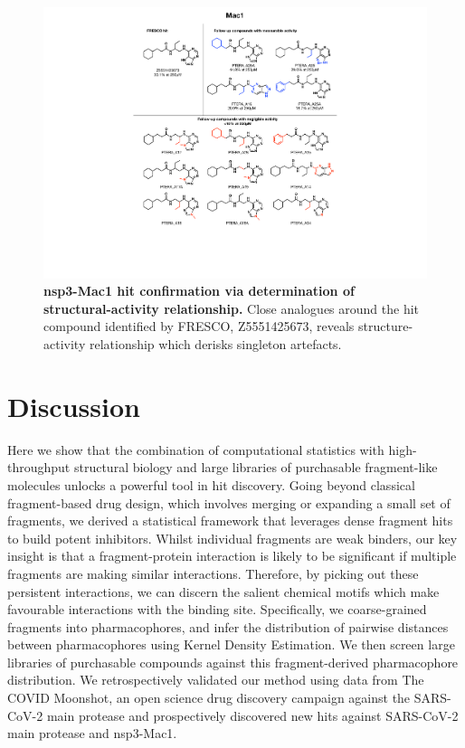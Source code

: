 \begin{figure}[!t]
 \centering
 \includegraphics[width=0.75\linewidth]{Chapters/Fresco/Figs/mac1_rounds.pdf}
 \caption{\textbf{nsp3-Mac1 hit confirmation via determination of structural-activity relationship.} Close analogues around the hit compound identified by FRESCO, Z5551425673, reveals structure-activity relationship which derisks singleton artefacts.}
 \label{fig:mac1_rounds}
\end{figure}


\section{Discussion} \label{sec:fresco_discussion}

Here we show that the combination of computational statistics with high-throughput structural biology and large libraries of purchasable fragment-like molecules unlocks a powerful tool in hit discovery. Going beyond classical fragment-based drug design, which involves merging or expanding a small set of fragments, we derived a statistical framework that leverages dense fragment hits to build potent inhibitors. Whilst individual fragments are weak binders, our key insight is that a fragment-protein interaction is likely to be significant if multiple fragments are making similar interactions. Therefore, by picking out these persistent interactions, we can discern the salient chemical motifs which make favourable interactions with the binding site. Specifically, we coarse-grained fragments into pharmacophores, and infer the distribution of pairwise distances between pharmacophores using Kernel Density Estimation. We then screen large libraries of purchasable compounds against this fragment-derived pharmacophore distribution. We retrospectively validated our method using data from The COVID Moonshot, an open science drug discovery campaign against the SARS-CoV-2 main protease and prospectively discovered new hits against SARS-CoV-2 main protease and nsp3-Mac1.

